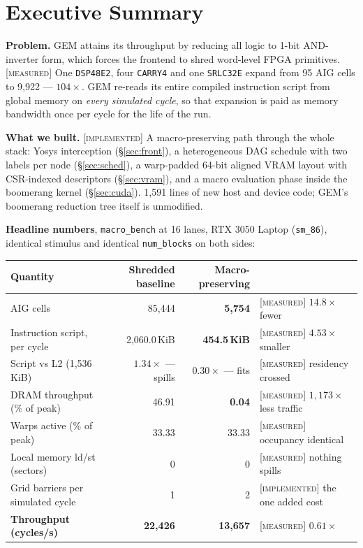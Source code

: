 \documentclass[11pt]{article}
\newcommand{\M}{\textcolor{blue!45!black}{\scriptsize\textsc{[measured]}}}
\newcommand{\I}{\textcolor{note}{\scriptsize\textsc{[implemented]}}}
\newcommand{\code}[1]{\texttt{\small #1}}
\begin{document}
\vspace{-2pt}
{\setcounter{tocdepth}{1}\small\tableofcontents}

\section{Executive Summary}

\textbf{Problem.} GEM attains its throughput by reducing all logic to 1-bit
AND-inverter form, which forces the frontend to shred word-level FPGA primitives.
\M{} One \code{DSP48E2}, four \code{CARRY4} and one \code{SRLC32E} expand from 95 AIG
cells to 9,922 --- $104\times$. GEM re-reads its entire compiled instruction script
from global memory on \emph{every simulated cycle}, so that expansion is paid as
memory bandwidth once per cycle for the life of the run.

\textbf{What we built.} \I{} A macro-preserving path through the whole stack:
Yosys interception (\S\ref{sec:front}), a heterogeneous DAG schedule with two labels
per node (\S\ref{sec:sched}), a warp-padded 64-bit aligned VRAM layout with
CSR-indexed descriptors (\S\ref{sec:vram}), and a macro evaluation phase inside the
boomerang kernel (\S\ref{sec:cuda}). 1,591 lines of new host and device code; GEM's
boomerang reduction tree itself is unmodified.

\textbf{Headline numbers}, \code{macro\_bench} at 16 lanes, RTX 3050 Laptop
(\code{sm\_86}), identical stimulus and identical \code{num\_blocks} on both sides:

\begin{center}\small
\begin{tabular}{lrrl}
\toprule
Quantity & Shredded baseline & Macro-preserving & \\
\midrule
AIG cells                        & 85,444 & \textbf{5,754} & \M{} $14.8\times$ fewer\\
Instruction script, per cycle    & 2,060.0\,KiB & \textbf{454.5\,KiB} & \M{} $4.53\times$ smaller\\
Script vs L2 (1,536\,KiB)        & $1.34\times$ --- spills & $\mathbf{0.30\times}$ --- fits & \M{} residency crossed\\
DRAM throughput (\% of peak)     & 46.91 & \textbf{0.04} & \M{} $1{,}173\times$ less traffic\\
Warps active (\% of peak)        & 33.33 & 33.33 & \M{} occupancy identical\\
Local memory ld/st (sectors)     & 0 & 0 & \M{} nothing spills\\
Grid barriers per simulated cycle& 1 & 2 & \I{} the one added cost\\
\midrule
\textbf{Throughput (cycles/s)}   & \textbf{22,426} & \textbf{13,657} & \M{} $0.61\times$\\
\bottomrule
\end{tabular}
\end{center}
\end{document}
